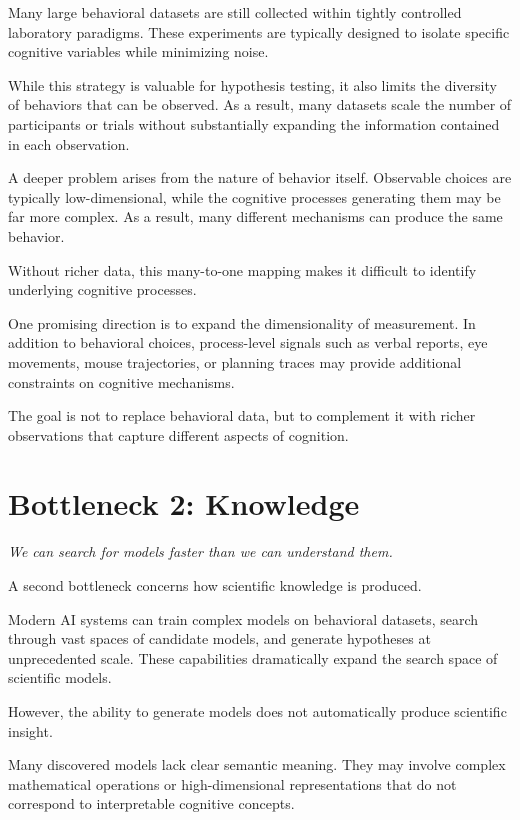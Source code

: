 \documentclass[11pt]{article}
\newcommand{\pullquote}[1]{
\vspace{0.5em}
\begin{center}
\textit{#1}
\end{center}
\vspace{0.5em}
}
\begin{document}
Many large behavioral datasets are still collected within tightly controlled laboratory paradigms. These experiments are typically designed to isolate specific cognitive variables while minimizing noise.

While this strategy is valuable for hypothesis testing, it also limits the diversity of behaviors that can be observed. As a result, many datasets scale the number of participants or trials without substantially expanding the information contained in each observation.

A deeper problem arises from the nature of behavior itself. Observable choices are typically low-dimensional, while the cognitive processes generating them may be far more complex. As a result, many different mechanisms can produce the same behavior.

Without richer data, this many-to-one mapping makes it difficult to identify underlying cognitive processes.

One promising direction is to expand the dimensionality of measurement. In addition to behavioral choices, process-level signals such as verbal reports, eye movements, mouse trajectories, or planning traces may provide additional constraints on cognitive mechanisms.

The goal is not to replace behavioral data, but to complement it with richer observations that capture different aspects of cognition.


\section*{Bottleneck 2: Knowledge}

\pullquote{We can search for models faster than we can understand them.}

A second bottleneck concerns how scientific knowledge is produced.

Modern AI systems can train complex models on behavioral datasets, search through vast spaces of candidate models, and generate hypotheses at unprecedented scale. These capabilities dramatically expand the search space of scientific models.

However, the ability to generate models does not automatically produce scientific insight.

Many discovered models lack clear semantic meaning. They may involve complex mathematical operations or high-dimensional representations that do not correspond to interpretable cognitive concepts.
\end{document}
